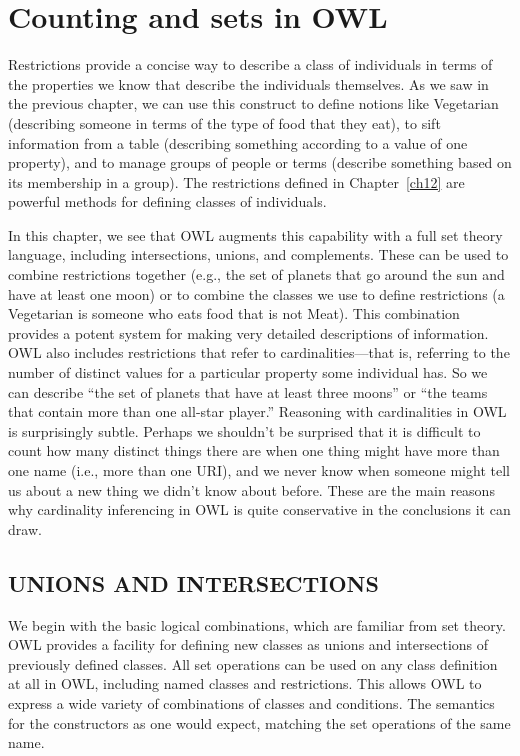 \chapter{Counting and sets in OWL}
\label{ch13}

Restrictions provide a concise way to describe a class of individuals in
terms of the properties we know that describe the individuals
themselves. As we saw in the previous chapter, we can use this construct
to define notions like Vegetarian (describing someone in terms of the
type of food that they eat), to sift information from a table
(describing something according to a value of one property), and to
manage groups of people or terms (describe something based on its
membership in a group). The restrictions defined in Chapter~\ref{ch12} are
powerful methods for defining classes of individuals.

In this chapter, we see that OWL augments this capability with a full
set theory language, including intersections, unions, and complements.
These can be used to combine restrictions together (e.g., the set of
planets that go around the sun and have at least one moon) or to combine
the classes we use to define restrictions (a Vegetarian is someone who
eats food that is not Meat). This combination provides a potent system
for making very detailed descriptions of information.
OWL also includes restrictions that refer to cardinalities---that is,
referring to the number of distinct values for a particular property
some individual has. So we can describe ``the set of planets that have
at least three moons'' or ``the teams that contain more than one
all-star player.'' Reasoning with cardinalities in OWL is surprisingly
subtle. Perhaps we shouldn't be surprised that it is difficult to count
how many distinct things there are when one thing might have more than
one name (i.e., more than one URI), and we never know when someone might
tell us about a new thing we didn't know about before. These are the
main reasons why cardinality inferencing in OWL is quite conservative in
the conclusions it can draw.

\section{UNIONS AND INTERSECTIONS}

We begin with the basic logical combinations, which are familiar from
set theory. OWL provides a facility for defining new classes as unions
and intersections of previously defined classes. All set operations can
be used on any class definition at all in OWL, including named classes
and restrictions. This allows OWL to express a wide variety of
combinations of classes and conditions. The semantics for the
constructors as one would expect, matching the set operations of the
same name.

